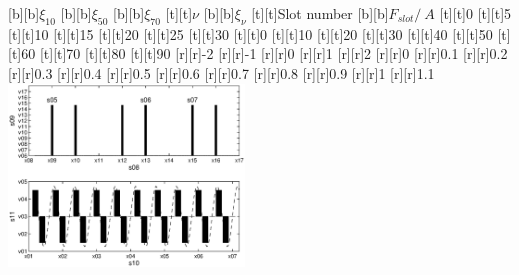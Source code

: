 %    
%
%
\begin{psfrags}%
\psfragscanon%
%
[b][b]{$\xi_{10}$}
[b][b]{$\xi_{50}$}
[b][b]{$\xi_{70}$}
[t][t]{$\nu$}
[b][b]{$\xi_{\nu}$}
[t][t]{Slot number}
[b][b]{$F_{slot}/\SI{}{A}$}
%
[t][t]{0}
[t][t]{5}
[t][t]{10}
[t][t]{15}
[t][t]{20}
[t][t]{25}
[t][t]{30}
[t][t]{0}
[t][t]{10}
[t][t]{20}
[t][t]{30}
[t][t]{40}
[t][t]{50}
[t][t]{60}
[t][t]{70}
[t][t]{80}
[t][t]{90}
%
[r][r]{-2}
[r][r]{-1}
[r][r]{0}
[r][r]{1}
[r][r]{2}
[r][r]{0}
[r][r]{0.1}
[r][r]{0.2}
[r][r]{0.3}
[r][r]{0.4}
[r][r]{0.5}
[r][r]{0.6}
[r][r]{0.7}
[r][r]{0.8}
[r][r]{0.9}
[r][r]{1}
[r][r]{1.1}
%
\includegraphics[width=0.47\textwidth]{figs/f_Qs_30_p_10_2.eps}
\end{psfrags}%
%
